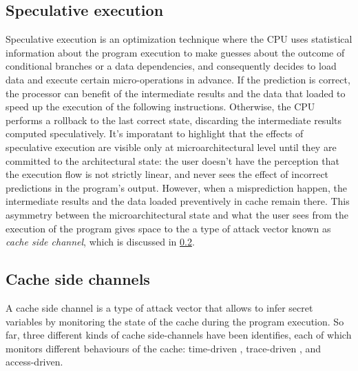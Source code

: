 \documentclass[12pt,a4paper]{book}
\theoremstyle{definition}
\begin{document}
	\subsection{Speculative execution}\label{sec:speculative-exec}
	Speculative execution is an optimization technique where the CPU uses statistical information about the program execution to make guesses about the outcome of conditional branches or a data dependencies, and consequently decides to load data and execute certain micro-operations in advance. If the prediction is correct, the processor can benefit of the intermediate results and the data that loaded to speed up the execution of the following instructions. Otherwise, the CPU performs a rollback to the last correct state, discarding the intermediate results computed speculatively. It's imporatant to highlight that the effects of speculative execution are visible only at microarchitectural level until they are committed to the architectural state: the user doesn't have the perception that the execution flow is not strictly linear, and never sees the effect of incorrect predictions in the program's output. However, when a misprediction happen, the intermediate results and the data loaded preventively in cache remain there. This asymmetry between the microarchitectural state and what the user sees from the execution of the program gives space to the a type of attack vector known as \textit{cache side channel}, which is discussed in \ref{sec:cache-sc}.
		
	\subsection{Cache side channels}\label{sec:cache-sc}
	A cache side channel \cite{Zhang2017} is a type of attack vector that allows to infer secret variables by monitoring the state of the cache during the program execution. So far, three different kinds of cache side-channels have been identifies, each of which monitors different behaviours of the cache: time-driven \cite{Page2002}, trace-driven \cite{Page2002}, and access-driven.
\end{document}
